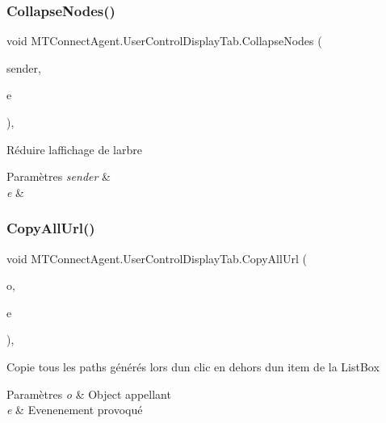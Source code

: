 \subsubsection{\texorpdfstring{Collapse\+Nodes()}{CollapseNodes()}}
{\footnotesize\ttfamily void M\+T\+Connect\+Agent.\+User\+Control\+Display\+Tab.\+Collapse\+Nodes (\begin{DoxyParamCaption}\item[{object}]{sender,  }\item[{Mouse\+Event\+Args}]{e }\end{DoxyParamCaption})\hspace{0.3cm}{\ttfamily [inline]}, {\ttfamily [private]}}



Réduire l\textquotesingle{}affichage de l\textquotesingle{}arbre 


\begin{DoxyParams}{Paramètres}
{\em sender} & \\
\hline
{\em e} & \\
\hline
\end{DoxyParams}
\mbox{\label{class_m_t_connect_agent_1_1_user_control_display_tab_ac473c5026d9d7af94210c53170be841b}} 
\subsubsection{\texorpdfstring{Copy\+All\+Url()}{CopyAllUrl()}}
{\footnotesize\ttfamily void M\+T\+Connect\+Agent.\+User\+Control\+Display\+Tab.\+Copy\+All\+Url (\begin{DoxyParamCaption}\item[{object}]{o,  }\item[{Mouse\+Event\+Args}]{e }\end{DoxyParamCaption})\hspace{0.3cm}{\ttfamily [inline]}, {\ttfamily [private]}}



Copie tous les paths générés lors d\textquotesingle{}un clic en dehors d\textquotesingle{}un item de la List\+Box 


\begin{DoxyParams}{Paramètres}
{\em o} & Object appellant\\
\hline
{\em e} & Evenenement provoqué\\
\hline
\end{DoxyParams}
\mbox{\label{class_m_t_connect_agent_1_1_user_control_display_tab_ac246a46fbe6cab71326ea2a6e6ade5cd}} 
